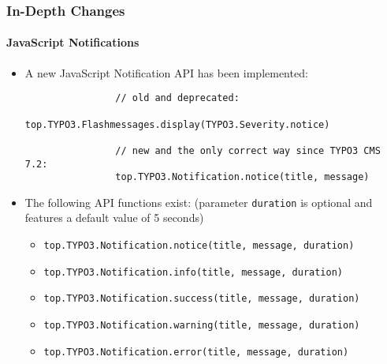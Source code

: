 \begin{frame}[fragile]
	\frametitle{In-Depth Changes}
	\framesubtitle{JavaScript Notifications}

	\begin{itemize}

		\item A new JavaScript Notification API has been implemented:
			\begin{lstlisting}
				// old and deprecated:
				top.TYPO3.Flashmessages.display(TYPO3.Severity.notice)

				// new and the only correct way since TYPO3 CMS 7.2:
				top.TYPO3.Notification.notice(title, message)
    		\end{lstlisting}

		\item The following API functions exist:\newline
			\small(parameter \texttt{duration} is optional and features a default value of 5 seconds)\normalsize
			\begin{itemize}
				\item \normalsize\smaller\texttt{top.TYPO3.Notification.notice(title, message, duration)}\normalsize
				\item \smaller\texttt{top.TYPO3.Notification.info(title, message, duration)}\normalsize
				\item \smaller\texttt{top.TYPO3.Notification.success(title, message, duration)}\normalsize
				\item \smaller\texttt{top.TYPO3.Notification.warning(title, message, duration)}\normalsize
				\item \smaller\texttt{top.TYPO3.Notification.error(title, message, duration)}\normalsize
			\end{itemize}

	\end{itemize}

\end{frame}

